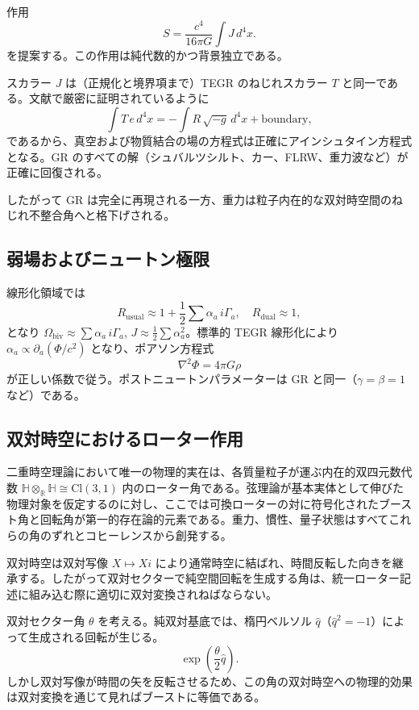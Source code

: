 \documentclass[a4paper]{article}
\begin{document}
作用
\[
S = \frac{c^4}{16\pi G} \int J \, d^4x.
\]
を提案する。この作用は純代数的かつ背景独立である。

スカラー $J$ は（正規化と境界項まで）TEGR のねじれスカラー $T$ と同一である。文献で厳密に証明されているように
\[
\int T \, e \, d^4x = -\int R \, \sqrt{-g} \, d^4x + \mathrm{boundary},
\]
であるから、真空および物質結合の場の方程式は正確にアインシュタイン方程式となる。GR のすべての解（シュバルツシルト、カー、FLRW、重力波など）が正確に回復される。

したがって GR は完全に再現される一方、重力は粒子内在的な双対時空間のねじれ不整合角へと格下げされる。

\subsection{弱場およびニュートン極限}

線形化領域では
\[
R_\text{usual} \approx 1 + \frac{1}{2} \sum \alpha_a \, i\Gamma_a, \quad R_\text{dual} \approx 1,
\]
となり $\Omega_\text{biv} \approx \sum \alpha_a \, i\Gamma_a$, $J \approx \frac{1}{2} \sum \alpha_a^2$。標準的 TEGR 線形化により $\alpha_a \propto \partial_a (\Phi/c^2)$ となり、ポアソン方程式
\[
\nabla^2 \Phi = 4\pi G \rho
\]
が正しい係数で従う。ポストニュートンパラメーターは GR と同一（$\gamma = \beta = 1$ など）である。

\subsection{双対時空におけるローター作用}
\label{subsec:dual-rotors}

二重時空理論において唯一の物理的実在は、各質量粒子が運ぶ内在的双四元数代数 $\mathbb{H} \otimes_{\mathbb{R}} \mathbb{H} \cong \mathrm{Cl}(3,1)$ 内のローター角である。弦理論が基本実体として伸びた物理対象を仮定するのに対し、ここでは可換ローターの対に符号化されたブースト角と回転角が第一的存在論的元素である。重力、慣性、量子状態はすべてこれらの角のずれとコヒーレンスから創発する。

双対時空は双対写像 $X \mapsto Xi$ により通常時空に結ばれ、時間反転した向きを継承する。したがって双対セクターで純空間回転を生成する角は、統一ローター記述に組み込む際に適切に双対変換されねばならない。

双対セクター角 $\theta$ を考える。純双対基底では、楕円ベルソル $\hat{q}$（$\hat{q}^2 = -1$）によって生成される回転が生じる。
\[
\exp\left( \frac{\theta}{2} \hat{q} \right).
\]
しかし双対写像が時間の矢を反転させるため、この角の双対時空への物理的効果は双対変換を通じて見ればブーストに等価である。
\end{document}
